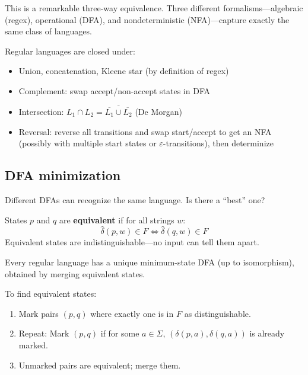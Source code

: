 This is a remarkable three-way equivalence. Three different formalisms---algebraic (regex), operational (DFA), and nondeterministic (NFA)---capture exactly the same class of languages.

\begin{theorem}
Regular languages are closed under:
\begin{itemize}
  \item Union, concatenation, Kleene star (by definition of regex)
  \item Complement: swap accept/non-accept states in DFA
  \item Intersection: $L_1 \cap L_2 = \overline{\overline{L_1} \cup \overline{L_2}}$ (De Morgan)
  \item Reversal: reverse all transitions and swap start/accept to get an NFA (possibly with multiple start states or $\varepsilon$-transitions), then determinize
\end{itemize}
\end{theorem}

\subsection*{DFA minimization}

Different DFAs can recognize the same language. Is there a ``best'' one?

\begin{definition}
States $p$ and $q$ are \textbf{equivalent} if for all strings $w$:
\[
\hat{\delta}(p, w) \in F \iff \hat{\delta}(q, w) \in F
\]
Equivalent states are indistinguishable---no input can tell them apart.
\end{definition}

\begin{theorem}[Minimization]
Every regular language has a unique minimum-state DFA (up to isomorphism), obtained by merging equivalent states.
\end{theorem}

\begin{definition}
To find equivalent states:
\begin{enumerate}
  \item Mark pairs $(p, q)$ where exactly one is in $F$ as distinguishable.
  \item Repeat: Mark $(p, q)$ if for some $a \in \Sigma$, $(\delta(p,a), \delta(q,a))$ is already marked.
  \item Unmarked pairs are equivalent; merge them.
\end{enumerate}
\end{definition}

